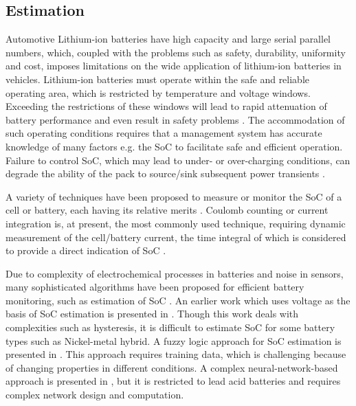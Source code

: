 \subsection{Estimation}

Automotive Lithium-ion batteries have high capacity and large serial parallel
numbers, which, coupled with the problems such as safety,
durability, uniformity and cost, imposes limitations on the wide
application of lithium-ion batteries in vehicles. Lithium-ion
batteries must operate within the safe and reliable operating area, which is restricted by temperature and voltage windows. Exceeding the restrictions of these windows will lead to rapid
attenuation of battery performance and even result in safety
problems \cite{ZS_lu}. The accommodation
of such operating conditions requires that a management system has accurate knowledge of  many factors e.g. the  SoC to facilitate safe and efficient operation.
Failure to control SoC, which may lead to under- or over-charging
conditions, can degrade the ability of the pack to source/sink
subsequent power transients \cite{ZS_bha}.

A variety of techniques have been proposed to measure or
monitor the SoC of a cell or battery, each having its relative
merits \cite{ZS_pil}. Coulomb counting or current
integration is, at present, the most commonly used technique,
requiring dynamic measurement of the cell/battery current,
the time integral of which is considered to provide a direct
indication of SoC \cite{ZS_cau}. 

 Due to complexity of electrochemical processes in batteries and noise in sensors, many sophisticated algorithms have been proposed for efficient battery monitoring, such as estimation of SoC \cite{ZS_cun}. An  earlier  work  which  uses  voltage  as  the  basis  of  SoC estimation is presented in \cite{ZS_ver}. Though this work deals with complexities  such  as  hysteresis,  it  is difficult to estimate SoC for some battery types such as Nickel-metal  hybrid.  A  fuzzy  logic  approach  for  SoC  estimation is  presented  in \cite{ZS_sin}. This approach  requires  training  data, which is  challenging  because  of  changing  properties  in  different conditions.  A  complex  neural-network-based  approach  is presented in \cite{ZS_ang}, but it is restricted to lead acid batteries and requires complex network design and computation. 
 
